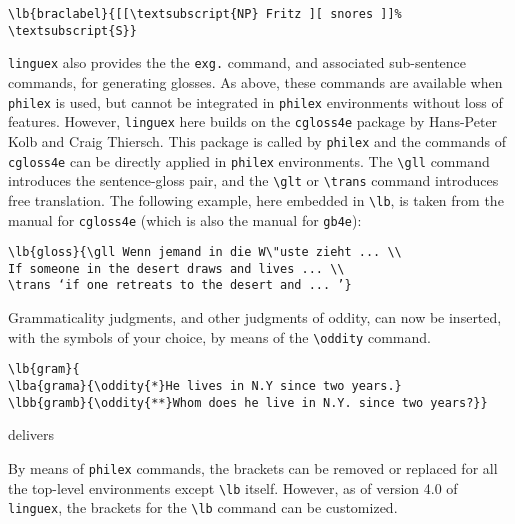 \documentclass[10pt]{article}
\begin{document}
\begin{verbatim}
\lb{braclabel}{[[\textsubscript{NP} Fritz ][ snores ]]%
\textsubscript{S}}
\end{verbatim}


\verb+linguex+ also  provides the the \verb+exg.+ command, and associated sub-sentence commands, for generating glosses. As above, these commands are available when \verb+philex+ is used, but cannot be integrated in \verb+philex+ environments without loss of features. However, \verb+linguex+ here builds on the \verb+cgloss4e+ package by Hans-Peter Kolb and Craig Thiersch. This package is called by \verb+philex+ and the commands of \verb+cgloss4e+ can be directly applied in \verb+philex+ environments. The \verb+\gll+ command introduces the sentence-gloss pair, and the \verb+\glt+ or \verb+\trans+ command introduces free translation. The following example, here embedded in \verb+\lb+, is taken from the manual for \verb+cgloss4e+ (which is also the manual for \verb+gb4e+):

\begin{verbatim}
\lb{gloss}{\gll Wenn jemand in die W\"uste zieht ... \\
If someone in the desert draws and lives ... \\
\trans ‘if one retreats to the desert and ... ’}
\end{verbatim}


Grammaticality judgments,  and other judgments of oddity, can now be inserted, with the symbols of your choice, by means of the \verb+\oddity+ command. 

\begin{verbatim}
\lb{gram}{
\lba{grama}{\oddity{*}He lives in N.Y since two years.}
\lbb{gramb}{\oddity{**}Whom does he live in N.Y. since two years?}}
\end{verbatim}%
% 
delivers


By means of \verb+philex+ commands, the brackets can be  removed or replaced for all the top-level environments except \verb+\lb+ itself. However, as of version 4.0 of \verb+linguex+, the brackets for the \verb+\lb+ command can be customized. 
\end{document}
